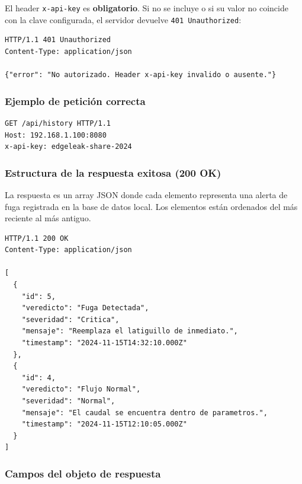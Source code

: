 \documentclass[12pt,a4paper]{article}
\begin{document}
El header \texttt{x-api-key} es \textbf{obligatorio}. Si no se incluye o si su valor
no coincide con la clave configurada, el servidor devuelve \texttt{401 Unauthorized}:

\begin{lstlisting}[language={}, caption={Respuesta cuando la API Key es incorrecta o falta}]
HTTP/1.1 401 Unauthorized
Content-Type: application/json

{"error": "No autorizado. Header x-api-key invalido o ausente."}
\end{lstlisting}

\subsubsection{Ejemplo de petición correcta}

\begin{lstlisting}[language={}, caption={Petición GET /api/history con autenticación correcta}]
GET /api/history HTTP/1.1
Host: 192.168.1.100:8080
x-api-key: edgeleak-share-2024
\end{lstlisting}

\subsubsection{Estructura de la respuesta exitosa (200 OK)}

La respuesta es un array JSON donde cada elemento representa una alerta de fuga
registrada en la base de datos local. Los elementos están ordenados del más reciente
al más antiguo.

\begin{lstlisting}[language={}, caption={Ejemplo de respuesta exitosa de GET /api/history}]
HTTP/1.1 200 OK
Content-Type: application/json

[
  {
    "id": 5,
    "veredicto": "Fuga Detectada",
    "severidad": "Critica",
    "mensaje": "Reemplaza el latiguillo de inmediato.",
    "timestamp": "2024-11-15T14:32:10.000Z"
  },
  {
    "id": 4,
    "veredicto": "Flujo Normal",
    "severidad": "Normal",
    "mensaje": "El caudal se encuentra dentro de parametros.",
    "timestamp": "2024-11-15T12:10:05.000Z"
  }
]
\end{lstlisting}

\subsubsection{Campos del objeto de respuesta}
\end{document}
